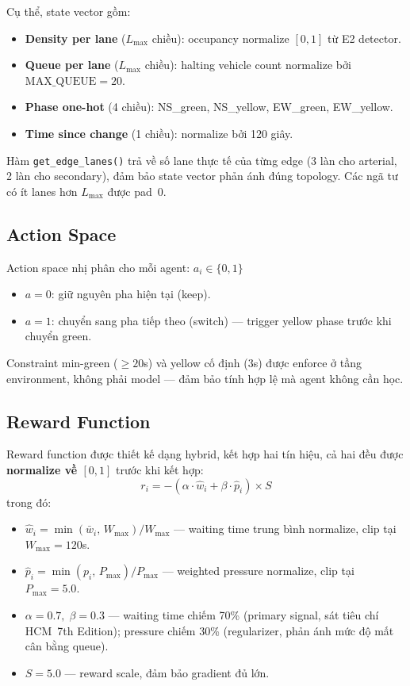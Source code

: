 \documentclass[conference]{IEEEtran}
\begin{document}
Cụ thể, state vector gồm:
\begin{itemize}[leftmargin=*]
    \item \textbf{Density per lane} ($L_{\max}$ chiều): occupancy normalize $[0, 1]$ từ E2 detector.
    \item \textbf{Queue per lane} ($L_{\max}$ chiều): halting vehicle count normalize bởi $\text{MAX\_QUEUE} = 20$.
    \item \textbf{Phase one-hot} (4 chiều): NS\_green, NS\_yellow, EW\_green, EW\_yellow.
    \item \textbf{Time since change} (1 chiều): normalize bởi 120 giây.
\end{itemize}

Hàm \texttt{get\_edge\_lanes()} trả về số lane thực tế của từng edge (3 làn cho arterial, 2 làn cho secondary), đảm bảo state vector phản ánh đúng topology. Các ngã tư có ít lanes hơn $L_{\max}$ được pad~0.

\subsection{Action Space}

Action space nhị phân cho mỗi agent: $a_i \in \{0, 1\}$
\begin{itemize}[leftmargin=*]
    \item $a = 0$: giữ nguyên pha hiện tại (keep).
    \item $a = 1$: chuyển sang pha tiếp theo (switch) --- trigger yellow phase trước khi chuyển green.
\end{itemize}

Constraint min-green ($\geq 20$s) và yellow cố định ($3$s) được enforce ở tầng environment, không phải model --- đảm bảo tính hợp lệ mà agent không cần học.

\subsection{Reward Function}
\label{sec:reward}

Reward function được thiết kế dạng hybrid, kết hợp hai tín hiệu, cả hai đều được \textbf{normalize về $[0, 1]$} trước khi kết hợp:
\begin{equation}
    r_i = -\left(\alpha \cdot \hat{w}_i + \beta \cdot \hat{p}_i\right) \times S
    \label{eq:reward}
\end{equation}
trong đó:
\begin{itemize}[leftmargin=*]
    \item $\hat{w}_i = \min\!\left(\bar{w}_i,\, W_{\max}\right) / W_{\max}$ --- waiting time trung bình normalize, clip tại $W_{\max} = 120$s.
    \item $\hat{p}_i = \min\!\left(p_i,\, P_{\max}\right) / P_{\max}$ --- weighted pressure normalize, clip tại $P_{\max} = 5.0$.
    \item $\alpha = 0.7,\; \beta = 0.3$ --- waiting time chiếm 70\% (primary signal, sát tiêu chí HCM~7th Edition); pressure chiếm 30\% (regularizer, phản ánh mức độ mất cân bằng queue).
    \item $S = 5.0$ --- reward scale, đảm bảo gradient đủ lớn.
\end{itemize}
\end{document}
